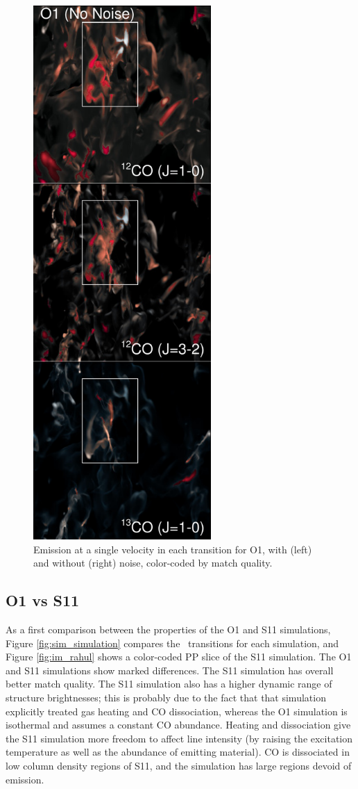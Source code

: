 \begin{figure}[htbp]
\includegraphics[height=8in]{figures/stella_nonoise_im}
\caption{Emission at a single velocity in each transition for O1, with (left) and without (right) noise, color-coded by match quality.}
\label{fig:im_stella}
\end{figure}

\subsection{O1 vs S11}
As a first comparison between the properties of the O1 and S11 simulations, Figure \ref{fig:sim_simulation} compares the \coa\, transitions for each simulation, and Figure \ref{fig:im_rahul} shows a color-coded PP slice of the S11 simulation. The O1 and S11 simulations show marked differences. The S11 simulation has overall better match quality. The S11 simulation also has a
higher dynamic range of structure brightnesses; this is probably due to
the fact that that simulation explicitly treated gas heating and
CO dissociation, whereas the O1 simulation is isothermal and assumes a constant CO abundance. Heating and dissociation
give the S11 simulation more freedom to affect line intensity (by raising the excitation temperature as well as
the abundance of emitting material). CO is dissociated in low column density regions of S11, and the simulation has large regions devoid of emission.

